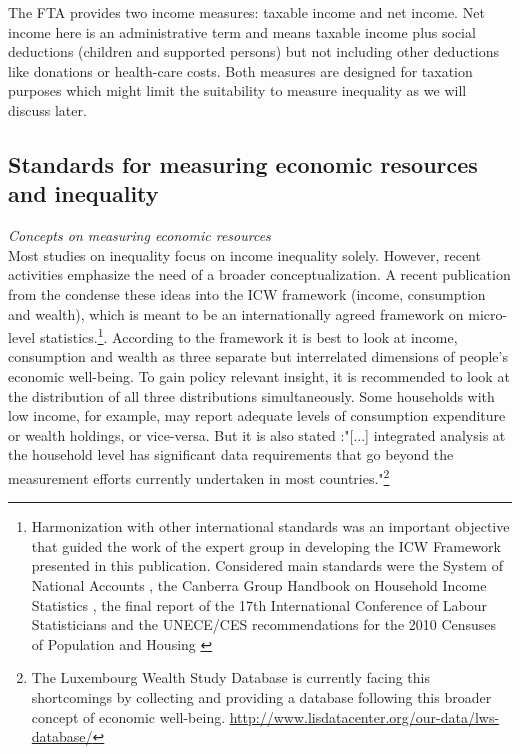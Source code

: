 \documentclass[twoside]{article}\usepackage[]{graphicx}\usepackage[]{color}
\begin{document}
\begin{multicols}{2}
The FTA provides two income measures: taxable income and net income. Net income here is an administrative term and means taxable income plus social deductions (children and supported persons) but not including other deductions like donations or health-care costs. Both measures are designed for taxation purposes which might limit the suitability to measure inequality as we will discuss later.




\subsection{Standards for measuring economic resources and inequality}

\emph{Concepts on measuring economic resources}  \\
Most studies on inequality focus on income inequality solely. However, recent activities emphasize the need of a broader conceptualization. A recent publication from the \citet{oecd_oecd_2013} condense these ideas into the ICW framework (income, consumption and wealth), which is meant to be an internationally agreed framework on micro-level statistics.\footnote{Harmonization with other international standards was an important objective that guided the work of the expert group in developing the ICW Framework presented in this publication. Considered main standards were the System of National Accounts \citep{sna_system_2008}, the Canberra Group Handbook on Household Income Statistics \citep{united_nations_canberra_2011}, the final report of the 17th International Conference of Labour Statisticians \citep{international_labour_organisation_ilo_final_2004} and the UNECE/CES recommendations for the 2010 Censuses of Population and Housing \citep{unece_conference_2006}}. According to the framework it is best to look at income, consumption and wealth as three separate but interrelated dimensions of people's economic well-being. To gain policy relevant insight, it is recommended to look at the distribution of all three distributions simultaneously. Some households with low income, for example, may report adequate levels of consumption expenditure or wealth holdings, or vice-versa. But it is also stated \citep[18]{oecd_oecd_2013}:"[...] integrated analysis at the household level has significant data requirements that go beyond the measurement efforts currently undertaken in most countries."\footnote{The Luxembourg Wealth Study Database is currently facing this shortcomings by collecting and providing a database following this broader concept of economic well-being. \url{http://www.lisdatacenter.org/our-data/lws-database/}} \\


\end{multicols}
\end{document}
